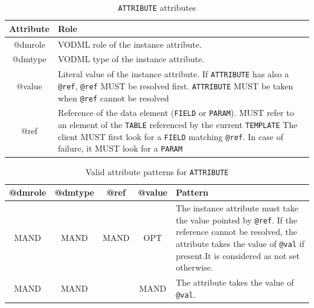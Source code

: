 \documentclass[11pt,a4paper]{ivoa}
\begin{document}
\begin{table}[hbtp]
\small
\centering
\begin{tabulary}{\linewidth}{|c|J|}
       \hline 
          \textbf{Attribute} & 
          \textbf{Role}\\
       \hline         \hline  
          @dmrole    & 
           VODML role of the instance attribute.\\       
       \hline 
          @dmtype    & 
          VODML type of the instance attribute.\\
       \hline  
          @value   &
          Literal value of the instance attribute. 
                     \newline If  \texttt{ATTRIBUTE} has also a \texttt{@ref}, \texttt{@ref} MUST be resolved first.
                     \texttt{ATTRIBUTE}  MUST be taken when \texttt{@ref} cannot be resolved \\
        \hline
           @ref & 
            Reference of the data element (\texttt{FIELD} or \texttt{PARAM}).  
                    \newline MUST refer to an element of the \texttt{TABLE}  referenced by the current     
                    \texttt{TEMPLATE}                    
                    \newline The client MUST first look for a \texttt{FIELD} matching \texttt{@ref}. 
                    \newline In case of failure, it MUST look for a \texttt{PARAM}
                    \\
       \hline 
     \end{tabulary}
     \caption{\texttt{ATTRIBUTE} attributes} 
     \label{tbl:att-att}
 \end{table}

\begin{table}[hbtp]
\small
\centering
\begin{tabulary}{1.0\linewidth}{|c|c|c|c|J|}

    \hline    
          \textbf{@dmrole}  &  
          \textbf{@dmtype} &  
          \textbf{@ref} &  
          \textbf{@value} &  
          \textbf{Pattern}\\
    \hline   \hline 
          MAND & 
          MAND &  
          MAND &  
          OPT & 
          The instance attribute must take the value pointed by \texttt{@ref}. 
           \newline If the reference cannot be resolved, the attribute takes the value of \texttt{@val} if present.\newline  It is considered as not set otherwise.   \\
     \hline  
          MAND & 
          MAND &   
          &  
          MAND & 
          The attribute takes the value of \texttt{@val}.   \\
     \hline 
  \end{tabulary}
  \caption{Valid attribute patterns for  \texttt{ATTRIBUTE}} 
  \label{tbl:att-pattern}
 \end{table}
\end{document}
